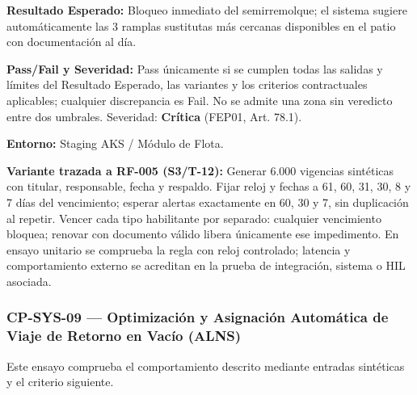 \par\noindent\textbf{Resultado Esperado:} Bloqueo inmediato del semirremolque; el sistema sugiere automáticamente las 3 ramplas sustitutas más cercanas disponibles en el patio con documentación al día.\par
\par\noindent\textbf{Pass/Fail y Severidad:} Pass únicamente si se cumplen todas las salidas y límites del Resultado Esperado, las variantes y los criterios contractuales aplicables; cualquier discrepancia es Fail. No se admite una zona sin veredicto entre dos umbrales. Severidad: \textbf{Crítica} (FEP01, Art. 78.1).\par
\par\noindent\textbf{Entorno:} Staging AKS / Módulo de Flota.\par







\par\noindent\textbf{Variante trazada a RF-005 (S3/T-12):} Generar 6.000 vigencias sintéticas con titular, responsable, fecha y respaldo. Fijar reloj y fechas a 61, 60, 31, 30, 8 y 7 días del vencimiento; esperar alertas exactamente en 60, 30 y 7, sin duplicación al repetir. Vencer cada tipo habilitante por separado: cualquier vencimiento bloquea; renovar con documento válido libera únicamente ese impedimento. En ensayo unitario se comprueba la regla con reloj controlado; latencia y comportamiento externo se acreditan en la prueba de integración, sistema o HIL asociada.\par
\subsubsection*{CP-SYS-09 — Optimización y Asignación Automática de Viaje de Retorno en Vacío (ALNS)}\label{sec:9-cp-sys-09}
Este ensayo comprueba el comportamiento descrito mediante entradas sintéticas y el criterio siguiente.

